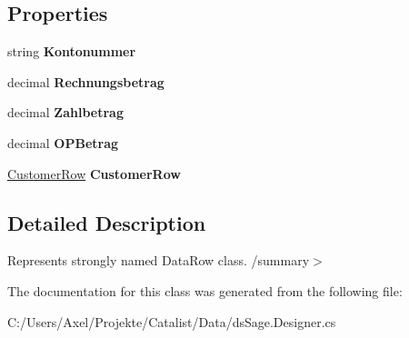 \subsection*{Properties}
\begin{DoxyCompactItemize}
\item 
string {\bfseries Kontonummer}\hypertarget{class_products_1_1_data_1_1ds_sage_1_1_unpaid_item_row_aba0d0855888d1dceceb53df6d8becb15}{}\label{class_products_1_1_data_1_1ds_sage_1_1_unpaid_item_row_aba0d0855888d1dceceb53df6d8becb15}

\item 
decimal {\bfseries Rechnungsbetrag}\hypertarget{class_products_1_1_data_1_1ds_sage_1_1_unpaid_item_row_adb6a2af83cf2b04fc002c5e07b0d53f0}{}\label{class_products_1_1_data_1_1ds_sage_1_1_unpaid_item_row_adb6a2af83cf2b04fc002c5e07b0d53f0}

\item 
decimal {\bfseries Zahlbetrag}\hypertarget{class_products_1_1_data_1_1ds_sage_1_1_unpaid_item_row_ac0486c2e47df596506eb1b88982067b2}{}\label{class_products_1_1_data_1_1ds_sage_1_1_unpaid_item_row_ac0486c2e47df596506eb1b88982067b2}

\item 
decimal {\bfseries O\+P\+Betrag}\hypertarget{class_products_1_1_data_1_1ds_sage_1_1_unpaid_item_row_a09c163adc149076a9e21dddcdee19271}{}\label{class_products_1_1_data_1_1ds_sage_1_1_unpaid_item_row_a09c163adc149076a9e21dddcdee19271}

\item 
\hyperlink{class_products_1_1_data_1_1ds_sage_1_1_customer_row}{Customer\+Row} {\bfseries Customer\+Row}\hypertarget{class_products_1_1_data_1_1ds_sage_1_1_unpaid_item_row_ac8936998cbcba63fa942e6bcc9df23e1}{}\label{class_products_1_1_data_1_1ds_sage_1_1_unpaid_item_row_ac8936998cbcba63fa942e6bcc9df23e1}

\end{DoxyCompactItemize}


\subsection{Detailed Description}
Represents strongly named Data\+Row class. /summary$>$ 

The documentation for this class was generated from the following file\+:\begin{DoxyCompactItemize}
\item 
C\+:/\+Users/\+Axel/\+Projekte/\+Catalist/\+Data/ds\+Sage.\+Designer.\+cs\end{DoxyCompactItemize}
